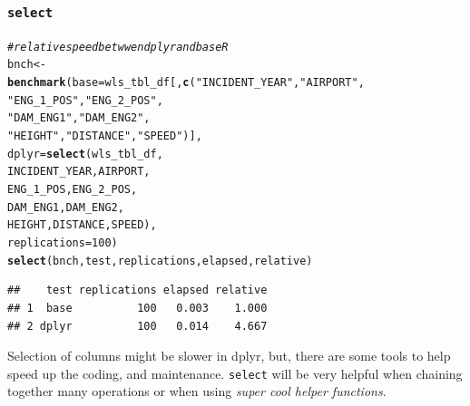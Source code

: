 \documentclass{beamer}\usepackage[]{graphicx}\usepackage[]{color}
\makeatletter
\newcommand{\hlnum}[1]{\textcolor[rgb]{0.686,0.059,0.569}{#1}}%
\newcommand{\hlstr}[1]{\textcolor[rgb]{0.192,0.494,0.8}{#1}}%
\newcommand{\hlcom}[1]{\textcolor[rgb]{0.678,0.584,0.686}{\textit{#1}}}%
\newcommand{\hlstd}[1]{\textcolor[rgb]{0.345,0.345,0.345}{#1}}%
\newcommand{\hlkwb}[1]{\textcolor[rgb]{0.69,0.353,0.396}{#1}}%
\newcommand{\hlkwc}[1]{\textcolor[rgb]{0.333,0.667,0.333}{#1}}%
\newcommand{\hlkwd}[1]{\textcolor[rgb]{0.737,0.353,0.396}{\textbf{#1}}}%
\newenvironment{kframe}{%
 \def\at@end@of@kframe{}%
 \ifinner\ifhmode%
  \def\at@end@of@kframe{\end{minipage}}%
  \begin{minipage}{\columnwidth}%
 \fi\fi%
 \def\FrameCommand##1{\hskip\@totalleftmargin \hskip-\fboxsep
 \colorbox{shadecolor}{##1}\hskip-\fboxsep
     \hskip-\linewidth \hskip-\@totalleftmargin \hskip\columnwidth}%
 \MakeFramed {\advance\hsize-\width
   \@totalleftmargin\z@ \linewidth\hsize
   \@setminipage}}%
 {\par\unskip\endMakeFramed%
 \at@end@of@kframe}
\newenvironment{knitrout}{}{} %
\makeatother
\begin{document}
\begin{frame}[fragile]
  \frametitle{{\tt select}}
\begin{knitrout}\footnotesize
{}\color{fgcolor}\begin{kframe}
\begin{alltt}
\hlcom{# relative speed betwwen dplyr and base R}
\hlstd{bnch} \hlkwb{<-}
  \hlkwd{benchmark}\hlstd{(}\hlkwc{base}  \hlstd{= wls_tbl_df[,} \hlkwd{c}\hlstd{(}\hlstr{"INCIDENT_YEAR"}\hlstd{,} \hlstr{"AIRPORT"}\hlstd{,}
                                   \hlstr{"ENG_1_POS"}\hlstd{,} \hlstr{"ENG_2_POS"}\hlstd{,}
                                   \hlstr{"DAM_ENG1"}\hlstd{,} \hlstr{"DAM_ENG2"}\hlstd{,}
                                   \hlstr{"HEIGHT"}\hlstd{,} \hlstr{"DISTANCE"}\hlstd{,} \hlstr{"SPEED"}\hlstd{)],}
            \hlkwc{dplyr} \hlstd{=} \hlkwd{select}\hlstd{(wls_tbl_df,}
                           \hlstd{INCIDENT_YEAR, AIRPORT,}
                           \hlstd{ENG_1_POS, ENG_2_POS,}
                           \hlstd{DAM_ENG1, DAM_ENG2,}
                           \hlstd{HEIGHT, DISTANCE, SPEED),}
            \hlkwc{replications} \hlstd{=} \hlnum{100}\hlstd{)}
\hlkwd{select}\hlstd{(bnch, test, replications, elapsed, relative)}
\end{alltt}
\begin{verbatim}
##    test replications elapsed relative
## 1  base          100   0.003    1.000
## 2 dplyr          100   0.014    4.667
\end{verbatim}
\end{kframe}
\end{knitrout}

Selection of columns might be slower in dplyr, but, there are some
tools to help speed up the coding, and maintenance.  {\tt select} will be very
helpful when chaining together many operations or when using \emph{super cool
helper functions}.
\end{frame} 
\end{document}
